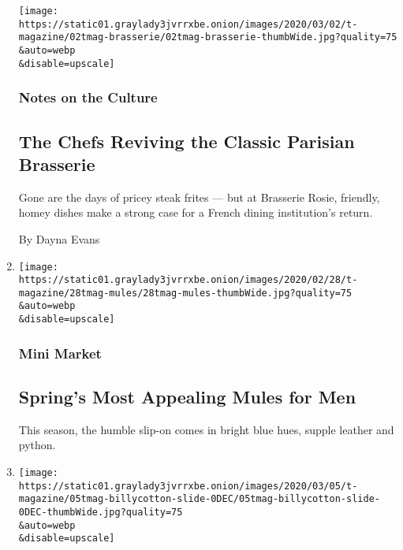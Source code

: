 \begin{enumerate}
  \texttt{[image: https://static01.graylady3jvrrxbe.onion/images/2020/03/02/t-magazine/02tmag-brasserie/02tmag-brasserie-thumbWide.jpg?quality=75\\\&auto=webp\\\&disable=upscale]}

  \hypertarget{notes-on-the-culture-3}{%
  \subsubsection{Notes on the Culture}\label{notes-on-the-culture-3}}

  \hypertarget{the-chefs-reviving-the-classic-parisian-brasserie}{%
  \subsection{The Chefs Reviving the Classic Parisian
  Brasserie}\label{the-chefs-reviving-the-classic-parisian-brasserie}}

  Gone are the days of pricey steak frites --- but at Brasserie Rosie,
  friendly, homey dishes make a strong case for a French dining
  institution's return.

  By Dayna Evans
\item
  \href{/2020/02/28/t-magazine/mule-mens-shoes.html}{}

  \texttt{[image: https://static01.graylady3jvrrxbe.onion/images/2020/02/28/t-magazine/28tmag-mules/28tmag-mules-thumbWide.jpg?quality=75\\\&auto=webp\\\&disable=upscale]}

  \hypertarget{mini-market}{%
  \subsubsection{Mini Market}\label{mini-market}}

  \hypertarget{springs-most-appealing-mules-for-men}{%
  \subsection{Spring's Most Appealing Mules for
  Men}\label{springs-most-appealing-mules-for-men}}

  This season, the humble slip-on comes in bright blue hues, supple
  leather and python.
\item
  \href{/slideshow/2020/02/27/t-magazine/inside-a-couples-tranquil-greek-revival-home-in-upstate-new-york.html}{}

  \texttt{[image: https://static01.graylady3jvrrxbe.onion/images/2020/03/05/t-magazine/05tmag-billycotton-slide-0DEC/05tmag-billycotton-slide-0DEC-thumbWide.jpg?quality=75\\\&auto=webp\\\&disable=upscale]}


\end{enumerate}
